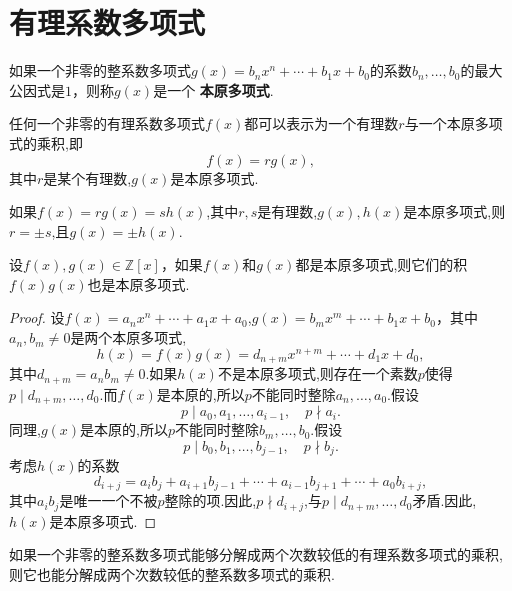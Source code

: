 \section{有理系数多项式}
\begin{definition}
    如果一个非零的整系数多项式$g(x)=b_nx^n+\cdots+b_1x+b_0$的系数$b_n,\ldots,b_0$的最大公因式是$1$，则称$g(x)$是一个 \textbf{本原多项式}.
\end{definition}
\begin{theorem}
    任何一个非零的有理系数多项式$f(x)$都可以表示为一个有理数$r$与一个本原多项式的乘积,即
    \begin{equation*}
        f(x)=rg(x),
    \end{equation*}
    其中$r$是某个有理数,$g(x)$是本原多项式.
\end{theorem}
如果$f(x)=rg(x)=sh(x)$,其中$r,s$是有理数,$g(x),h(x)$是本原多项式,则$r=\pm s$,且$g(x)=\pm h(x)$.
\begin{theorem}[高斯引理]
    设$f(x),g(x)\in\mathbb{Z}[x]$，如果$f(x)$和$g(x)$都是本原多项式,则它们的积$f(x)g(x)$也是本原多项式.
\end{theorem}
\begin{proof}
    设$f(x)=a_nx^n+\cdots+a_1x+a_0$,$g(x)=b_mx^m+\cdots+b_1x+b_0$，其中$a_n,b_m\neq 0$是两个本原多项式,
    \begin{equation*}
        h(x)=f(x)g(x)=d_{n+m}x^{n+m}+\cdots+d_1x+d_0,
    \end{equation*}
    其中$d_{n+m}=a_nb_m\neq 0$.如果$h(x)$不是本原多项式,则存在一个素数$p$使得$p\mid d_{n+m},\ldots,d_0$.而$f(x)$是本原的,所以$p$不能同时整除$a_n,\ldots,a_0$.假设
    \begin{equation*}
        p\mid a_0,a_1,\ldots,a_{i-1},\quad p\nmid a_i.
    \end{equation*}
    同理,$g(x)$是本原的,所以$p$不能同时整除$b_m,\ldots,b_0$.假设
    \begin{equation*}
        p\mid b_0,b_1,\ldots,b_{j-1},\quad p\nmid b_j.
    \end{equation*}
    考虑$h(x)$的系数\begin{equation*}
        d_{i+j}=a_ib_j+a_{i+1}b_{j-1}+\cdots+a_{i-1}b_{j+1}+\cdots+a_0b_{i+j},  
    \end{equation*}
    其中$a_ib_j$是唯一一个不被$p$整除的项.因此,$p\nmid d_{i+j}$,与$p\mid d_{n+m},\ldots,d_0$矛盾.因此,$h(x)$是本原多项式.
\end{proof}
\begin{theorem}
    如果一个非零的整系数多项式能够分解成两个次数较低的有理系数多项式的乘积,则它也能分解成两个次数较低的整系数多项式的乘积.
\end{theorem}
